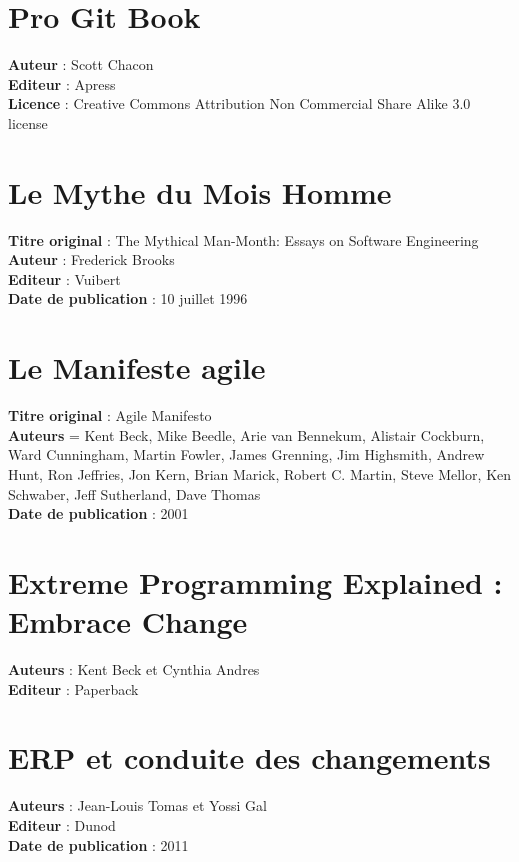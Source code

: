 
\section*{Pro Git Book}
\noindent
\textbf{Auteur} : Scott Chacon \\
\textbf{Editeur} : Apress \\
\textbf{Licence} : Creative Commons Attribution Non Commercial Share Alike 3.0 license\\

\section*{Le Mythe du Mois Homme}
\noindent
\textbf{Titre original} : The Mythical Man-Month: Essays on Software Engineering\\
\textbf{Auteur} : Frederick Brooks\\
\textbf{Editeur} : Vuibert \\
\textbf{Date de publication} : 10 juillet 1996 \\

\section*{Le Manifeste agile}
\noindent
\textbf{Titre original} : Agile Manifesto\\
\textbf{Auteurs} = Kent Beck, Mike Beedle, Arie van Bennekum, Alistair Cockburn, Ward Cunningham, Martin Fowler, James Grenning, Jim Highsmith, Andrew Hunt, Ron Jeffries, Jon Kern, Brian Marick, Robert C. Martin, Steve Mellor, Ken Schwaber, Jeff Sutherland, Dave Thomas\\
\textbf{Date de publication} : 2001\\

\section*{Extreme Programming Explained : Embrace Change}
\noindent
\textbf{Auteurs} : Kent Beck et Cynthia Andres\\
\textbf{Editeur} : Paperback\\

\section*{ERP et conduite des changements}
\noindent
\textbf{Auteurs} : Jean-Louis Tomas et Yossi Gal\\
\textbf{Editeur} : Dunod\\
\textbf{Date de publication} : 2011\\
